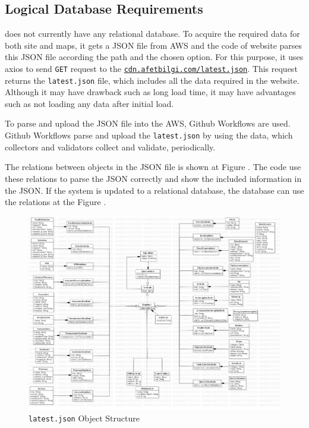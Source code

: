 \subsection{Logical Database Requirements}

\afetbilgi does not currently have any relational database. To acquire the required data for both site and maps, it gets a JSON file from AWS and the code of website parses this JSON file according the path and the chosen option. For this purpose, it uses axios to send \texttt{GET} request to the \href{https://cdn.afetbilgi.com/latest.json}{\texttt{cdn.afetbilgi.com/latest.json}}. This request returns the \texttt{latest.json} file, which includes all the data required in the website. Although it may have drawback such as long load time, it may have advantages such as not loading any data after initial load.

To parse and upload the JSON file into the AWS, Github Workflows are used. Github Workflows parse and upload the \texttt{latest.json} by using the data, which collectors and validators collect and validate, periodically.

The relations between objects in the JSON file is shown at Figure . The code use these relations to parse the JSON correctly and show the included information in the JSON. If the system is updated to a relational database, the database can use the relations at the Figure .

\begin{figure}[H]
    \centering
    \includegraphics[width=\linewidth]{img/database.jpg}
    \caption{\texttt{latest.json} Object Structure}
\end{figure}

